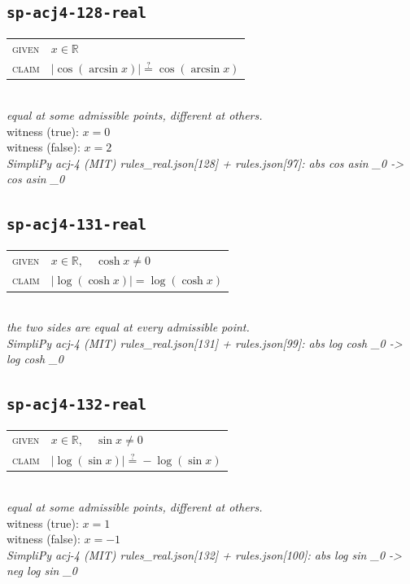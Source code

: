 \documentclass[11pt]{article}
\begin{document}
\subsection*{\texttt{sp-acj4-128-real}}
\begin{tabular}{@{}l@{\quad}l@{}}
\textsc{given} & $x \in \mathbb{R}$ \\[4pt]
\textsc{claim} & $\displaystyle \left|\cos\left(\arcsin x\right)\right| \overset{?}{=} \cos\left(\arcsin x\right)$ \\
\end{tabular}\\[2pt]
{\small\emph{equal at some admissible points, different at others.}}\\
{\footnotesize\color{gray}witness (true): $x = 0$}\\
{\footnotesize\color{gray}witness (false): $x = 2$}\\
\emph{SimpliPy acj-4 (MIT) rules\_real.json[128] + rules.json[97]: abs cos asin \_0  ->  cos asin \_0}\\

\subsection*{\texttt{sp-acj4-131-real}}
\begin{tabular}{@{}l@{\quad}l@{}}
\textsc{given} & $x \in \mathbb{R},\quad \cosh x \neq 0$ \\[4pt]
\textsc{claim} & $\displaystyle \left|\log\left(\cosh x\right)\right| = \log\left(\cosh x\right)$ \\
\end{tabular}\\[2pt]
{\small\emph{the two sides are equal at every admissible point.}}\\
\emph{SimpliPy acj-4 (MIT) rules\_real.json[131] + rules.json[99]: abs log cosh \_0  ->  log cosh \_0}\\

\subsection*{\texttt{sp-acj4-132-real}}
\begin{tabular}{@{}l@{\quad}l@{}}
\textsc{given} & $x \in \mathbb{R},\quad \sin x \neq 0$ \\[4pt]
\textsc{claim} & $\displaystyle \left|\log\left(\sin x\right)\right| \overset{?}{=} -\log\left(\sin x\right)$ \\
\end{tabular}\\[2pt]
{\small\emph{equal at some admissible points, different at others.}}\\
{\footnotesize\color{gray}witness (true): $x = 1$}\\
{\footnotesize\color{gray}witness (false): $x = -1$}\\
\emph{SimpliPy acj-4 (MIT) rules\_real.json[132] + rules.json[100]: abs log sin \_0  ->  neg log sin \_0}\\
\end{document}
